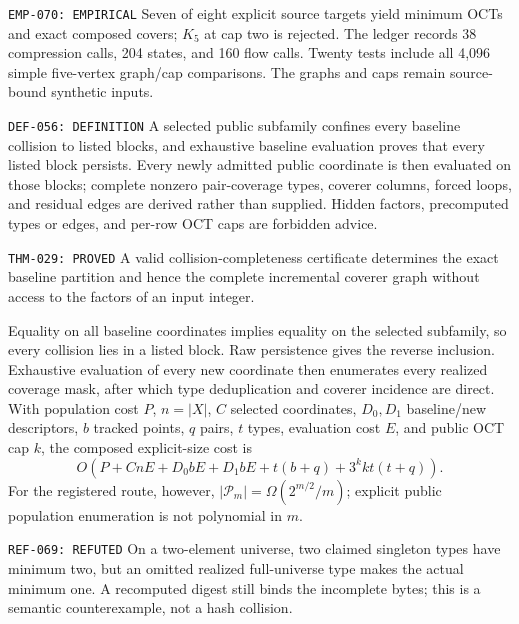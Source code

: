 \documentclass[11pt]{article}
\begin{document}
{\texttt{EMP-070: EMPIRICAL}}
Seven of eight explicit source targets yield minimum OCTs and exact composed
covers; \(K_5\) at cap two is rejected.  The ledger records 38 compression
calls, 204 states, and 160 flow calls.  Twenty tests include all 4,096
simple five-vertex graph/cap comparisons.  The graphs and caps remain
source-bound synthetic inputs.

{\texttt{DEF-056: DEFINITION}}
A selected public subfamily confines every baseline collision to listed
blocks, and exhaustive baseline evaluation proves that every listed block
persists.  Every newly admitted public coordinate is then evaluated on those
blocks; complete nonzero pair-coverage types, coverer columns, forced loops,
and residual edges are derived rather than supplied.  Hidden factors,
precomputed types or edges, and per-row OCT caps are forbidden advice.

{\texttt{THM-029: PROVED}}
A valid collision-completeness certificate determines the exact baseline
partition and hence the complete incremental coverer graph without access to
the factors of an input integer.
\begin{claimproof}
Equality on all baseline coordinates implies equality on the selected
subfamily, so every collision lies in a listed block.  Raw persistence gives
the reverse inclusion.  Exhaustive evaluation of every new coordinate then
enumerates every realized coverage mask, after which type deduplication and
coverer incidence are direct.  With population cost \(P\), \(n=|X|\), \(C\)
selected coordinates, \(D_0,D_1\) baseline/new descriptors, \(b\) tracked
points, \(q\) pairs, \(t\) types, evaluation cost \(E\), and public OCT cap
\(k\), the composed explicit-size cost is
\[
 O\!\left(P+CnE+D_0bE+D_1bE+t(b+q)+3^kkt(t+q)\right).
\]
For the registered route, however,
\(|\mathcal P_m|=\Omega(2^{m/2}/m)\); explicit public population
enumeration is not polynomial in \(m\).
\end{claimproof}

{\texttt{REF-069: REFUTED}}
On a two-element universe, two claimed singleton types have minimum two, but
an omitted realized full-universe type makes the actual minimum one.  A
recomputed digest still binds the incomplete bytes; this is a semantic
counterexample, not a hash collision.
\end{document}
